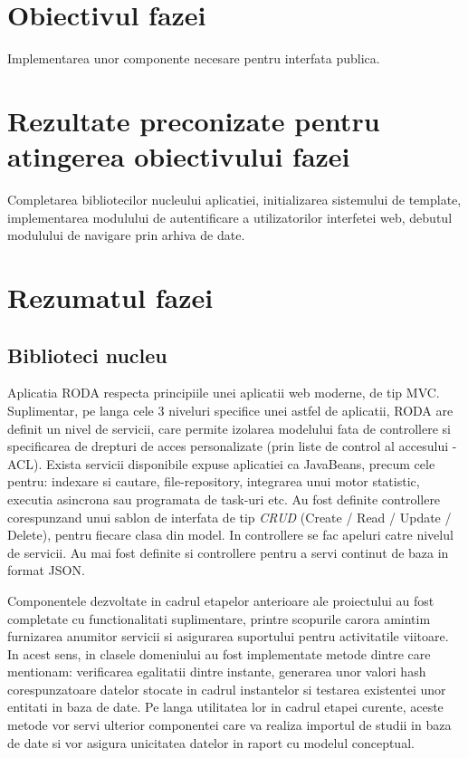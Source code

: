 \documentclass[a4paper, 10pt]{article}
\begin{document}
{\section{Obiectivul fazei}


Implementarea unor componente necesare pentru interfata publica.

\section{Rezultate preconizate pentru atingerea obiectivului fazei}


Completarea bibliotecilor nucleului aplicatiei, initializarea sistemului de
template, implementarea modulului de autentificare a utilizatorilor interfetei
web, debutul modulului de navigare prin arhiva de date.

\section{Rezumatul fazei}

\medskip

\subsection*{Biblioteci nucleu}

\medskip

Aplicatia RODA respecta principiile unei aplicatii web moderne, de tip MVC. Suplimentar, pe langa cele 3 niveluri specifice unei astfel de aplicatii, RODA are definit un nivel de servicii, care permite izolarea modelului fata de controllere si specificarea de drepturi de acces personalizate (prin liste de control al accesului - ACL). Exista servicii disponibile expuse aplicatiei ca JavaBeans, precum cele pentru: 
indexare si cautare, file-repository, integrarea unui motor statistic, executia asincrona sau programata de task-uri etc. 
Au fost definite controllere corespunzand unui sablon de interfata de tip \emph{CRUD}
(Create / Read / Update / Delete), pentru fiecare clasa din model. 
In controllere se fac apeluri catre nivelul de servicii. 
Au mai fost definite si controllere pentru a servi continut de baza in format JSON.

Componentele dezvoltate in cadrul etapelor anterioare ale proiectului au fost completate cu functionalitati suplimentare, printre scopurile carora amintim furnizarea anumitor servicii si asigurarea suportului pentru activitatile viitoare. In acest sens, in clasele domeniului au fost implementate metode dintre care mentionam: verificarea egalitatii dintre instante, generarea unor valori hash corespunzatoare datelor stocate in cadrul instantelor si testarea existentei unor entitati in baza de date. Pe langa utilitatea lor in cadrul etapei curente, aceste metode vor servi ulterior componentei care va realiza importul de studii in baza de date si vor asigura unicitatea datelor in raport cu modelul conceptual. 

}
\end{document}
